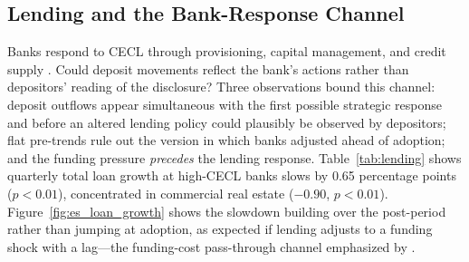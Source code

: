\subsection{Lending and the Bank-Response Channel}
\label{sec:robustness:lending}

Banks respond to CECL through provisioning, capital management, and
credit supply \citep{granja2025current, chen2022does, kim2026current}.
Could deposit movements reflect the bank's actions rather than
depositors' reading of the disclosure?  Three observations bound this
channel: deposit outflows appear simultaneous with the first possible
strategic response and before an altered lending policy could plausibly
be observed by depositors; flat pre-trends rule out the version in which
banks adjusted ahead of adoption; and the funding pressure
\emph{precedes} the lending response.
Table~\ref{tab:lending} shows quarterly total loan growth at high-CECL
banks slows by 0.65 percentage points ($p<0.01$), concentrated in
commercial real estate ($-0.90$, $p<0.01$).
Figure~\ref{fig:es_loan_growth} shows the slowdown building over the
post-period rather than jumping at adoption, as expected if lending
adjusts to a funding shock with a lag---the funding-cost pass-through
channel emphasized by \citet{granja2025current}.
